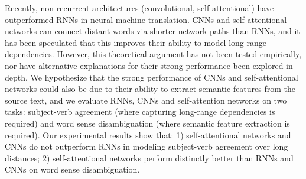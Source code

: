 Recently, non-recurrent architectures (convolutional, self-attentional) have outperformed RNNs in neural machine translation. CNNs and self-attentional networks can connect distant words via shorter network paths than RNNs, and it has been speculated that this improves their ability to model long-range dependencies. However, this theoretical argument has not been tested empirically, nor have alternative explanations for their strong performance been explored in-depth. We hypothesize that the strong performance of CNNs and self-attentional networks could also be due to their ability to extract semantic features from the source text, and we evaluate RNNs, CNNs and self-attention networks on two tasks: subject-verb agreement (where capturing long-range dependencies is required) and word sense disambiguation (where semantic feature extraction is required). Our experimental results show that: 1) self-attentional networks and CNNs do not outperform RNNs in modeling subject-verb agreement over long distances; 2) self-attentional networks perform distinctly better than RNNs and CNNs on word sense disambiguation.
